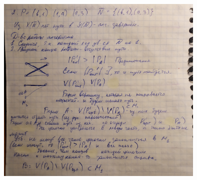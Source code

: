 \documentclass[discrete.tex]{subfiles}
\begin{document}
  \begin{figure}[H]
          \includegraphics[width=10cm]{pics/51_3}
          \centering
  \end{figure}
\end{document}
